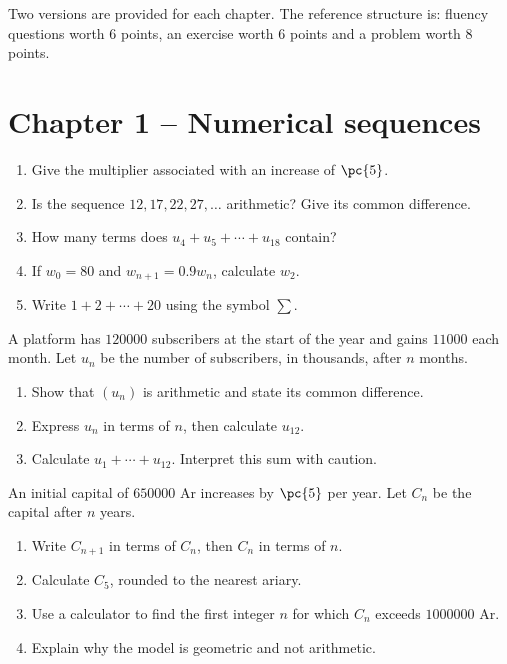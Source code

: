 Two versions are provided for each chapter. The reference structure is: fluency questions worth 6 points, an exercise worth 6 points and a problem worth 8 points.
\section*{Chapter 1 -- Numerical sequences}
\begin{exercise}[1 -- Fluency]
\begin{enumerate}
\item Give the multiplier associated with an increase of $\pc{5}$.
\item Is the sequence $12,17,22,27,\ldots$ arithmetic? Give its common difference.
\item How many terms does $u_4+u_5+\cdots+u_{18}$ contain?
\item If $w_0=80$ and $w_{n+1}=\num{0,9}w_n$, calculate $w_2$.
\item Write $1+2+\cdots+20$ using the symbol $\sum$.
\end{enumerate}
\end{exercise}
\begin{exercise}[2 -- Subscriptions]
A platform has $\num{120000}$ subscribers at the start of the year and gains $\num{11000}$ each month. Let $u_n$ be the number of subscribers, in thousands, after $n$ months.
\begin{enumerate}
\item Show that $(u_n)$ is arithmetic and state its common difference.
\item Express $u_n$ in terms of $n$, then calculate $u_{12}$.
\item Calculate $u_1+\cdots+u_{12}$. Interpret this sum with caution.
\end{enumerate}
\end{exercise}
\begin{exercise}
An initial capital of $\num{650000}$ Ar increases by $\pc{5}$ per year. Let $C_n$ be the capital after $n$ years.
\begin{enumerate}
\item Write $C_{n+1}$ in terms of $C_n$, then $C_n$ in terms of $n$.
\item Calculate $C_5$, rounded to the nearest ariary.
\item Use a calculator to find the first integer $n$ for which $C_n$ exceeds $\num{1000000}$ Ar.
\item Explain why the model is geometric and not arithmetic.
\end{enumerate}
\end{exercise}
